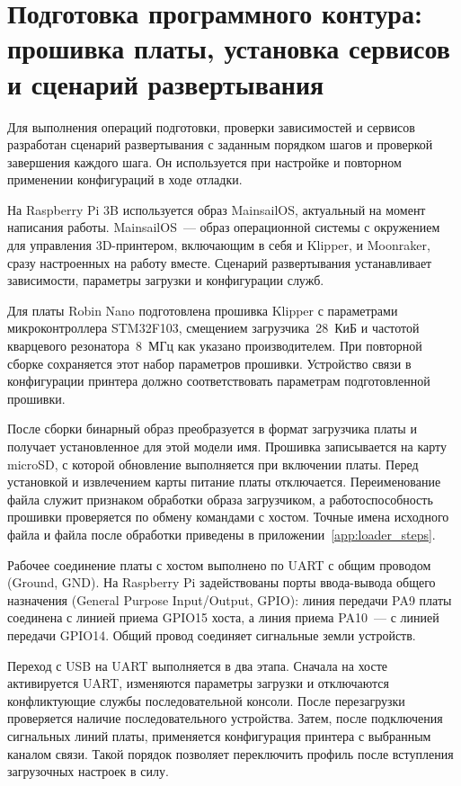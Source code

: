\section{Подготовка программного контура: прошивка платы, установка сервисов и сценарий развертывания}

Для выполнения операций подготовки, проверки зависимостей и сервисов разработан сценарий развертывания с заданным порядком шагов и проверкой завершения каждого шага. Он используется при настройке и повторном применении конфигураций в ходе отладки.

На Raspberry Pi 3B используется образ MainsailOS, актуальный на момент написания работы. MainsailOS~--- образ операционной системы с окружением для управления 3D-принтером, включающим в себя и Klipper, и Moonraker, сразу настроенных на работу вместе. Сценарий развертывания устанавливает зависимости, параметры загрузки и конфигурации служб.

Для платы Robin Nano подготовлена прошивка Klipper с параметрами микроконтроллера STM32F103, смещением загрузчика~28~КиБ и частотой кварцевого резонатора~8~МГц как указано производителем.  При повторной сборке сохраняется этот набор параметров прошивки. Устройство связи в конфигурации принтера должно соответствовать параметрам подготовленной прошивки.

После сборки бинарный образ преобразуется в формат загрузчика платы и получает установленное для этой модели имя. Прошивка записывается на карту microSD, с которой обновление выполняется при включении платы. Перед установкой и извлечением карты питание платы отключается. Переименование файла служит признаком обработки образа загрузчиком, а работоспособность прошивки проверяется по обмену командами с хостом. Точные имена исходного файла и файла после обработки приведены в приложении~\ref{app:loader_steps}.

Рабочее соединение платы с хостом выполнено по UART с общим проводом (Ground, GND). На Raspberry Pi задействованы порты ввода-вывода общего назначения (General Purpose Input/Output, GPIO): линия передачи PA9 платы соединена с линией приема GPIO15 хоста, а линия приема PA10~--- с линией передачи GPIO14. Общий провод соединяет сигнальные земли устройств.

Переход с USB на UART выполняется в два этапа. Сначала на хосте активируется UART, изменяются параметры загрузки и отключаются конфликтующие службы последовательной консоли. После перезагрузки проверяется наличие последовательного устройства. Затем, после подключения сигнальных линий платы, применяется конфигурация принтера с выбранным каналом связи. Такой порядок позволяет переключить профиль после вступления загрузочных настроек в силу.

